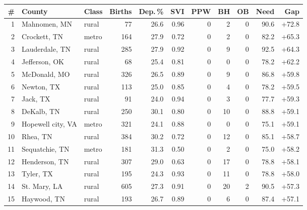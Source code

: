 \begin{tabular}{@{}rllrrrrrrrr@{}}
\toprule
\# & County & Class & Births & Dep.\,\% & SVI & PPW & BH & OB & Need & Gap \\
\midrule
1 & Mahnomen, MN & rural & 77 & 26.6 & 0.96 & 0 & 2 & 0 & 90.6 & +72.8 \\
2 & Crockett, TN & metro & 164 & 27.9 & 0.72 & 0 & 2 & 0 & 82.2 & +65.3 \\
3 & Lauderdale, TN & rural & 285 & 27.9 & 0.92 & 0 & 9 & 0 & 92.5 & +64.3 \\
4 & Jefferson, OK & rural & 68 & 25.4 & 0.81 & 0 & 0 & 0 & 78.2 & +62.2 \\
5 & McDonald, MO & rural & 326 & 26.5 & 0.89 & 0 & 9 & 0 & 86.8 & +59.8 \\
6 & Newton, TX & rural & 113 & 25.0 & 0.85 & 0 & 4 & 0 & 78.2 & +59.5 \\
7 & Jack, TX & rural & 91 & 24.0 & 0.94 & 0 & 3 & 0 & 77.7 & +59.3 \\
8 & DeKalb, TN & rural & 250 & 30.1 & 0.80 & 0 & 10 & 0 & 88.8 & +59.1 \\
9 & Hopewell city, VA & metro & 321 & 24.1 & 0.88 & 0 & 0 & 0 & 75.1 & +59.1 \\
10 & Rhea, TN & rural & 384 & 30.2 & 0.72 & 0 & 12 & 0 & 85.1 & +58.7 \\
11 & Sequatchie, TN & metro & 181 & 31.3 & 0.50 & 0 & 2 & 0 & 75.0 & +58.2 \\
12 & Henderson, TN & rural & 307 & 29.0 & 0.63 & 0 & 17 & 0 & 78.8 & +58.1 \\
13 & Tyler, TX & rural & 195 & 24.3 & 0.93 & 0 & 11 & 0 & 78.8 & +58.0 \\
14 & St. Mary, LA & rural & 605 & 27.3 & 0.91 & 0 & 20 & 2 & 90.5 & +57.3 \\
15 & Haywood, TN & rural & 193 & 26.7 & 0.89 & 0 & 6 & 0 & 87.4 & +57.1 \\
\bottomrule
\end{tabular}